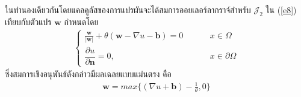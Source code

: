 \hspace{1cm} ในทำนองเดียวกันโดยแคลคูลัสของการแปรผันจะได้สมการออยเลอร์ลากราจ์สำหรับ $\mathcal{J}_2$ ใน (\ref{e8}) เทียบกับตัวแปร $\boldsymbol{w}$ กำหนดโดย
\begin{align}
	\left \{ \begin{array}{ll} 	\frac{\boldsymbol{w}}{|\boldsymbol{w}|} + \theta(\boldsymbol{w}-\nabla u-\boldsymbol{b}) = 0   & \hspace{1cm} x \in \Omega \\
	\dfrac{\partial u}{\partial \boldsymbol{n}} = 0, & \hspace{1cm} x \in \partial \Omega \end{array} \right .
\end{align}
ซึ่งสมการเชิงอนุพันธ์ดังกล่าวมีผลเฉลยแบบแม่นตรง \cite{ref:splitbergman-inpaint} คือ 
\begin{align}
	\boldsymbol{w} = max\bigg\{(\nabla u + \boldsymbol{b}) - \frac{1}{\theta},0\bigg\}
	\label{equation:euler_w_exact}
\end{align}
